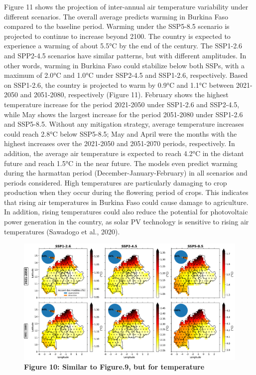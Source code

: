 \documentclass[
]{book}
\begin{document}
Figure 11 shows the projection of inter-annual air temperature variability under different scenarios. The overall average predicts warming in Burkina Faso compared to the baseline period. Warming under the SSP5-8.5 scenario is projected to continue to increase beyond 2100. The country is expected to experience a warming of about 5.5°C by the end of the century. The SSP1-2.6 and SPP2-4.5 scenarios have similar patterns, but with different amplitudes. In other words, warming in Burkina Faso could stabilize below both SSPs, with a maximum of 2.0°C and 1.0°C under SSP2-4.5 and SSP1-2.6, respectively. Based on SSP1-2.6, the country is projected to warm by 0.9°C and 1.1°C between 2021-2050 and 2051-2080, respectively (Figure 11). February shows the highest temperature increase for the period 2021-2050 under SSP1-2.6 and SSP2-4.5, while May shows the largest increase for the period 2051-2080 under SSP1-2.6 and SSP5-8.5. Without any mitigation strategy, average temperature increases could reach 2.8°C below SSP5-8.5; May and April were the months with the highest increases over the 2021-2050 and 2051-2070 periods, respectively. In addition, the average air temperature is expected to reach 4.2°C in the distant future and reach 1.5°C in the near future. The models even predict warming during the harmattan period (December-January-February) in all scenarios and periods considered. High temperatures are particularly damaging to crop production when they occur during the flowering period of crops. This indicates that rising air temperatures in Burkina Faso could cause damage to agriculture. In addition, rising temperatures could also reduce the potential for photovoltaic power generation in the country, as solar PV technology is sensitive to rising air temperatures (Sawadogo et al., 2020).

\begin{figure}
\centering
\includegraphics{Figures and Photos/Figure 10.png}
\caption{\textbf{Figure 10: Similar to Figure.9, but for temperature}}
\end{figure}
\end{document}
